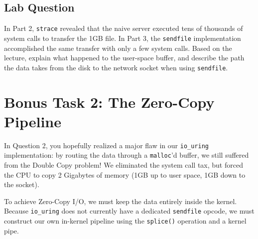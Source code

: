 \documentclass[11pt, a4paper]{article}
\begin{document}
\subsection*{Lab Question}

\noindent In Part 2, \texttt{strace} revealed that the naive server executed tens of thousands of system calls to transfer the 1GB file. In Part 3, the \texttt{sendfile} implementation accomplished the same transfer with only a few system calls. Based on the lecture, explain what happened to the user-space buffer, and describe the path the data takes from the disk to the network socket when using \texttt{sendfile}.

\section*{Bonus Task 2: The Zero-Copy Pipeline}

In Question 2, you hopefully realized a major flaw in our \texttt{io\_uring} implementation: by routing the data through a \texttt{malloc}'d buffer, we still suffered from the Double Copy problem! We eliminated the system call tax, but forced the CPU to copy 2 Gigabytes of memory (1GB up to user space, 1GB down to the socket).

To achieve Zero-Copy I/O, we must keep the data entirely inside the kernel. Because \texttt{io\_uring} does not currently have a dedicated \texttt{sendfile} opcode, we must construct our own in-kernel pipeline using the \texttt{splice()} operation and a kernel pipe.
\end{document}
